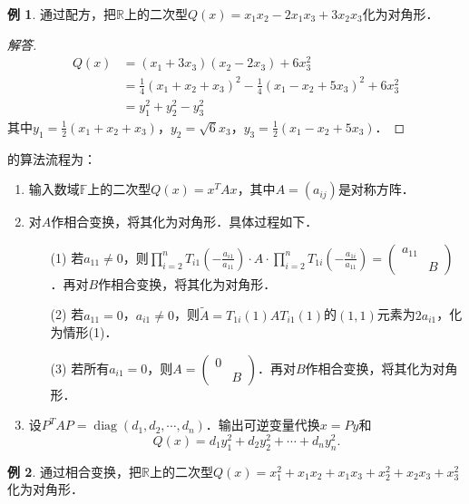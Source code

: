 \documentclass[a4paper,fontset=windows]{ctexbook}
\theoremstyle{definition}
\newtheorem{example}{例}[chapter]
\DeclareMathOperator{\diag}{diag}
\begin{document}
\begin{example}
通过配方，把$\mathbb{R}$上的二次型$Q(x)=x_1x_2-2x_1x_3+3x_2x_3$化为对角形．
\end{example}

\begin{proof}[解答]
~\vspace*{-27pt}\begin{align*}
Q(x)&=(x_1+3x_3)(x_2-2x_3)+6x_3^2 \\
&=\tfrac{1}{4}(x_1+x_2+x_3)^2-\tfrac{1}{4}(x_1-x_2+5x_3)^2+6x_3^2 \\
&=y_1^2+y_2^2-y_3^2
\end{align*}
其中$y_1=\frac{1}{2}(x_1+x_2+x_3)$，$y_2=\sqrt{6}x_3$，$y_3=\frac{1}{2}(x_1-x_2+5x_3)$．
\end{proof}

的算法流程为：

\begin{enumerate}
\item 输入数域$\mathbb{F}$上的二次型$Q(x)=x^TAx$，其中$A=(a_{ij})$是对称方阵．

\item 对$A$作相合变换，将其化为对角形．具体过程如下．
\begin{itemize}
\item[(1)] 若$a_{11}\ne 0$，则$\prod\limits_{i=2}^nT_{i1}(-\frac{a_{i1}}{a_{11}})\cdot A\cdot \prod\limits_{i=2}^nT_{1i}(-\frac{a_{1i}}{a_{11}})=\begin{pmatrix}a_{11}& \\ &B\end{pmatrix}$．再对$B$作相合变换，将其化为对角形．

\item[(2)] 若$a_{11}=0$，$a_{i1}\ne 0$，则$\widetilde{A}=T_{1i}(1)AT_{i1}(1)$的$(1,1)$元素为$2a_{i1}$，化为情形(1)．

\item[(3)] 若所有$a_{i1}=0$，则$A=\begin{pmatrix}0& \\ &B\end{pmatrix}$．再对$B$作相合变换，将其化为对角形．
\end{itemize}

\item 设$P^TAP=\diag(d_1,d_2,\cdots,d_n)$．输出可逆变量代换$x=Py$和$$Q(x)=d_1y_1^2+d_2y_2^2+\cdots+d_ny_n^2.$$
\end{enumerate}

\begin{example}
通过相合变换，把$\mathbb{R}$上的二次型$Q(x)=x_1^2+x_1x_2+x_1x_3+x_2^2+x_2x_3+x_3^2$化为对角形．
\end{example}
\end{document}

